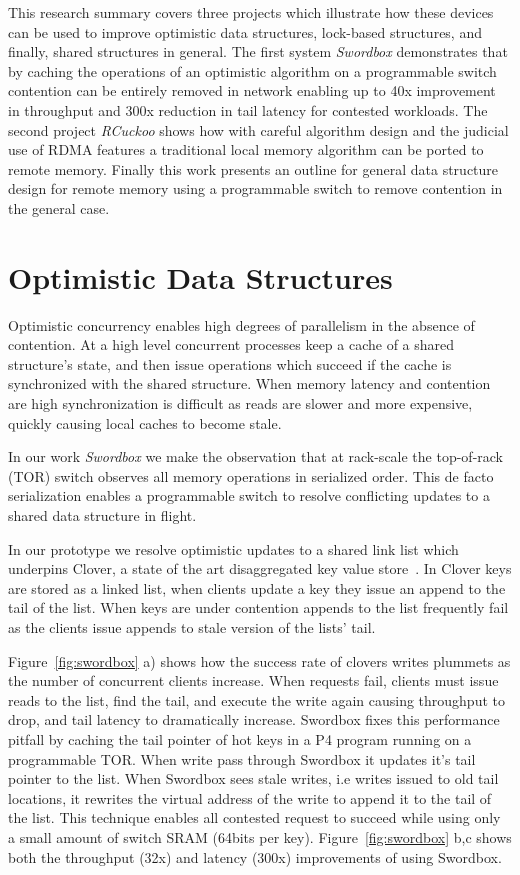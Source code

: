 This research summary covers three projects which illustrate
how these devices can be used to improve optimistic data
structures, lock-based structures, and finally, shared
structures in general.  The first system \textit{Swordbox}
demonstrates that by caching the operations of an optimistic
algorithm on a programmable switch contention can be
entirely removed in network enabling up to 40x improvement
in throughput and 300x reduction in tail latency for
contested workloads. The second project \textit{RCuckoo}
shows how with careful algorithm design and the judicial use
of RDMA features a traditional local memory algorithm can be
ported to remote memory. Finally this work presents an
outline for general data structure design for remote memory
using a programmable switch to remove contention in the
general case.


\section{Optimistic Data Structures}

Optimistic concurrency enables high degrees of parallelism
in the absence of contention. At a high level concurrent
processes keep a cache of a shared structure's state, and
then issue operations which succeed if the cache is
synchronized with the shared structure. When memory latency
and contention are high synchronization is difficult as
reads are slower and more expensive,  quickly causing local
caches to become stale.

In our work \textit{Swordbox} we make the observation that
at rack-scale the top-of-rack (TOR) switch observes all
memory operations in serialized order. This de facto
serialization enables a programmable switch to resolve
conflicting updates to a shared data structure in flight.

In our prototype we resolve optimistic updates to a shared
link list which underpins Clover, a state of the art
disaggregated key value store~\cite{clover}. In Clover keys
are stored as a linked list, when clients update a key they
issue an append to the tail of the list. When keys are under
contention appends to the list frequently fail as the
clients issue appends to stale version of the lists' tail.

Figure~\ref{fig:swordbox} a) shows how the success rate of
clovers writes plummets as the number of concurrent clients
increase. When requests fail, clients must issue reads to
the list, find the tail, and execute the write again causing
throughput to drop, and tail latency to dramatically
increase. Swordbox fixes this performance pitfall by caching
the tail pointer of hot keys in a P4 program running on a
programmable TOR. When write pass through Swordbox it
updates it's tail pointer to the list.  When Swordbox sees
stale writes, i.e writes issued to old tail locations, it
rewrites the virtual address of the write to append it to
the tail of the list. This technique enables all contested
request to succeed while using only a small amount of switch
SRAM (64bits per key). Figure~\ref{fig:swordbox} b,c shows
both the throughput (32x) and latency (300x) improvements of
using Swordbox.

